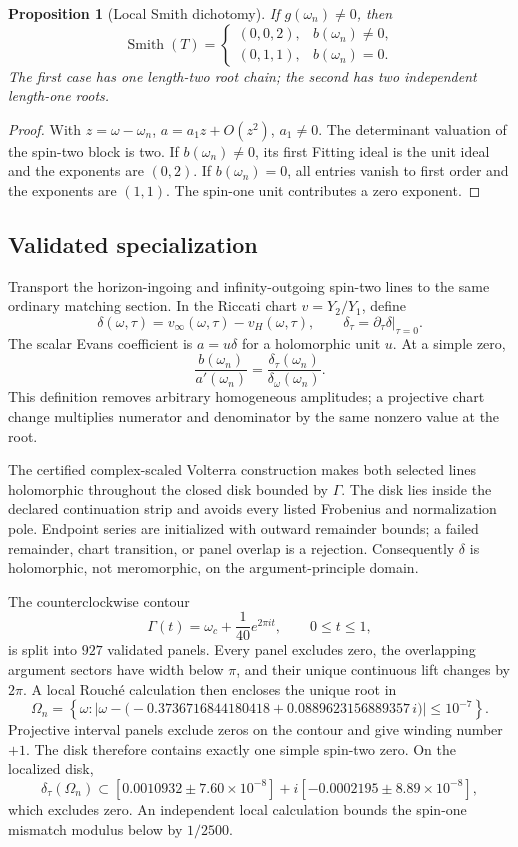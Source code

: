 \documentclass[11pt]{article}
\newtheorem{proposition}[theorem]{Proposition}
\theoremstyle{remark}
\newcommand{\Smith}{\operatorname{Smith}}
\begin{document}
\begin{proposition}[Local Smith dichotomy]\label{prop:smith}
If \(g(\omega_n)\ne0\), then
\[
 \Smith(T)=
 \begin{cases}
 (0,0,2),&b(\omega_n)\ne0,\\
 (0,1,1),&b(\omega_n)=0.
 \end{cases}
\]
The first case has one length-two root chain; the second has two
independent length-one roots.
\end{proposition}

\begin{proof}
With \(z=\omega-\omega_n\),
\(a=a_1z+O(z^2)\), \(a_1\ne0\).  The determinant valuation of the
spin-two block is two.  If \(b(\omega_n)\ne0\), its first Fitting ideal is
the unit ideal and the exponents are \((0,2)\).  If \(b(\omega_n)=0\),
all entries vanish to first order and the exponents are \((1,1)\).
The spin-one unit contributes a zero exponent.
\end{proof}

\subsection{Validated specialization}

Transport the horizon-ingoing and infinity-outgoing spin-two lines to the
same ordinary matching section.  In the Riccati chart \(v=Y_2/Y_1\), define
\[
 \delta(\omega,\tau)
 =v_\infty(\omega,\tau)-v_H(\omega,\tau),\qquad
 \delta_\tau=\left.\partial_\tau\delta\right|_{\tau=0}.
\]
The scalar Evans coefficient is \(a=u\delta\) for a holomorphic unit
\(u\).  At a simple zero,
\[
 \frac{b(\omega_n)}{a'(\omega_n)}
 =\frac{\delta_\tau(\omega_n)}{\delta_\omega(\omega_n)}.
\]
This definition removes arbitrary homogeneous amplitudes; a projective
chart change multiplies numerator and denominator by the same nonzero
value at the root.

The certified complex-scaled Volterra construction makes both selected
lines holomorphic throughout the closed disk bounded by \(\Gamma\).  The
disk lies inside the declared continuation strip and avoids every listed
Frobenius and normalization pole.  Endpoint series are initialized with
outward remainder bounds; a failed remainder, chart transition, or panel
overlap is a rejection.  Consequently \(\delta\) is holomorphic, not
meromorphic, on the argument-principle domain.

The counterclockwise contour
\[
 \Gamma(t)=\omega_c+\frac1{40}e^{2\pi it},
 \qquad 0\le t\le1,
\]
is split into \(927\) validated panels.  Every panel excludes zero, the
overlapping argument sectors have width below \(\pi\), and their unique
continuous lift changes by \(2\pi\).  A local Rouch\'e calculation then
encloses the unique root in
\[
 \Omega_n=
 \left\{\omega:
 \left|\omega-
 \bigl(-0.3736716844180418+0.0889623156889357\,i\bigr)
 \right|\le10^{-7}\right\}.
\]
Projective interval panels exclude zeros on the contour and give winding
number \(+1\).  The disk therefore contains exactly one simple spin-two
zero.  On the localized disk,
\[
 \delta_\tau(\Omega_n)
 \subset
 [0.0010932\pm7.60\times10^{-8}]
 +i[-0.0002195\pm8.89\times10^{-8}],
\]
which excludes zero.  An independent local calculation bounds the
spin-one mismatch modulus below by \(1/2500\).
\end{document}
